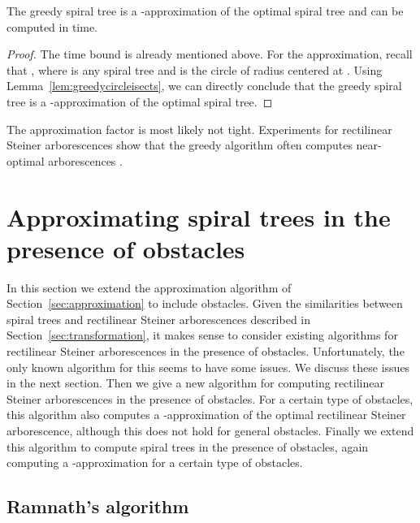 \documentclass{journalA4}
\begin{document}
\begin{theorem}
The greedy spiral tree is a -approximation of the optimal spiral tree and can be computed in  time.
\end{theorem}
\begin{proof}
The time bound is already mentioned above. For the approximation, recall that , where  is any spiral tree and
 is the circle of radius  centered at . Using Lemma~\ref{lem:greedycircleisects}, we can directly conclude that the greedy spiral tree is a -approximation
of the optimal spiral tree.
\end{proof}

\noindent The approximation factor is most likely not tight. Experiments for rectilinear Steiner arborescences show that the greedy algorithm
often computes near-optimal arborescences \cite{Cordova94}.


\section{Approximating spiral trees in the presence of obstacles}\label{sec:obstacles}

In this section we extend the approximation algorithm of Section~\ref{sec:approximation} to include obstacles. Given the similarities between spiral trees and rectilinear Steiner arborescences described in Section~\ref{sec:transformation}, it makes sense to consider existing algorithms for rectilinear Steiner arborescences in the presence of obstacles. Unfortunately, the only known algorithm for this seems to have some issues. We discuss these issues in the next section. Then we give a new algorithm for computing rectilinear Steiner arborescences in the presence of obstacles. For a certain type of obstacles, this algorithm also computes a -approximation of the optimal rectilinear Steiner arborescence, although this does not hold for general obstacles. Finally we extend this algorithm to compute spiral trees in the presence of obstacles, again computing a -approximation for a certain type of obstacles.

\subsection{Ramnath's algorithm}\label{sec:ramnath}
\end{document}
